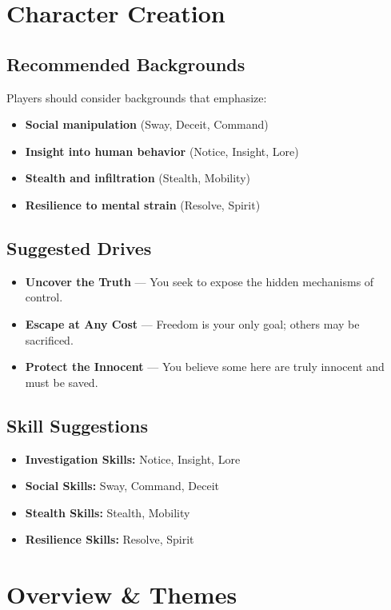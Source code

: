 \documentclass[11pt]{article}
\begin{document}
\section{Character Creation}
\subsection{Recommended Backgrounds}
Players should consider backgrounds that emphasize:
\begin{itemize}
  \item \textbf{Social manipulation} (Sway, Deceit, Command)
  \item \textbf{Insight into human behavior} (Notice, Insight, Lore)
  \item \textbf{Stealth and infiltration} (Stealth, Mobility)
  \item \textbf{Resilience to mental strain} (Resolve, Spirit)
\end{itemize}

\subsection{Suggested Drives}
\begin{itemize}
  \item \textbf{Uncover the Truth} --- You seek to expose the hidden mechanisms of control.
  \item \textbf{Escape at Any Cost} --- Freedom is your only goal; others may be sacrificed.
  \item \textbf{Protect the Innocent} --- You believe some here are truly innocent and must be saved.
\end{itemize}

\subsection{Skill Suggestions}
\begin{itemize}
  \item \textbf{Investigation Skills:} Notice, Insight, Lore
  \item \textbf{Social Skills:} Sway, Command, Deceit
  \item \textbf{Stealth Skills:} Stealth, Mobility
  \item \textbf{Resilience Skills:} Resolve, Spirit
\end{itemize}

\section{Overview \& Themes}
\end{document}
